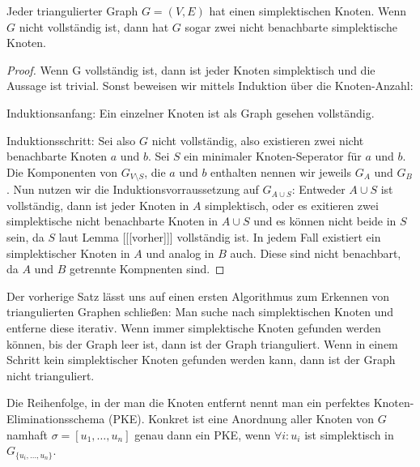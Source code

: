 \documentclass[../main.tex]{subfiles}
\begin{document}
\begin{lemma}\label{thm:4.2}
    Jeder triangulierter Graph $G = (V, E)$ hat einen simplektischen Knoten. Wenn $G$ nicht vollständig ist, dann hat $G$ sogar zwei nicht benachbarte simplektische Knoten.
\end{lemma}
\begin{proof}
    Wenn G vollständig ist, dann ist jeder Knoten simplektisch und die Aussage ist trivial. Sonst beweisen wir mittels Induktion über die Knoten-Anzahl:
    
    Induktionsanfang: Ein einzelner Knoten ist als Graph gesehen vollständig.
    
    Induktionsschritt: Sei also $G$ nicht vollständig, also existieren zwei nicht benachbarte Knoten $a$ und $b$. Sei $S$ ein minimaler Knoten-Seperator für $a$ und $b$. Die Komponenten von $G_{V \setminus S}$, die $a$ und $b$ enthalten nennen wir jeweils $G_A$ und $G_B$. Nun nutzen wir die Induktionsvorraussetzung auf $G_{A \cup S}$: Entweder $A \cup S$ ist vollständig, dann ist jeder Knoten in $A$ simplektisch, oder es exitieren zwei simplektische nicht benachbarte Knoten in $A \cup S$ und es können nicht beide in $S$ sein, da $S$ laut Lemma [[[vorher]]] vollständig ist. In jedem Fall existiert ein simplektischer Knoten in $A$ und analog in $B$ auch. Diese sind nicht benachbart, da $A$ und $B$ getrennte Kompnenten sind.
\end{proof}
    
Der vorherige Satz lässt uns auf einen ersten Algorithmus zum Erkennen von triangulierten Graphen schließen: Man suche nach simplektischen Knoten und entferne diese iterativ. Wenn immer simplektische Knoten gefunden werden können, bis der Graph leer ist, dann ist der Graph trianguliert. Wenn in einem Schritt kein simplektischer Knoten gefunden werden kann, dann ist der Graph nicht trianguliert.

Die Reihenfolge, in der man die Knoten entfernt nennt man ein perfektes Knoten-Eliminationsschema (PKE). Konkret ist eine Anordnung aller Knoten von $G$ namhaft $\sigma = [u_1, \hdots, u_n]$ genau dann ein PKE, wenn $\forall i : u_i$ ist simplektisch in $G_{\{u_i, \hdots, u_n\}}$.
\end{document}
